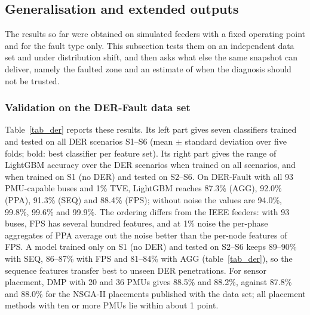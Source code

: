 \documentclass[11pt]{article}
\newenvironment{nw}{}{}
\begin{document}
\begin{nw}
\subsection{Generalisation and extended outputs}\label{subsec5_gen}
The results so far were obtained on simulated feeders with a fixed operating point and for the fault type only. This subsection tests them on an independent data set and under distribution shift, and then asks what else the same snapshot can deliver, namely the faulted zone and an estimate of when the diagnosis should not be trusted.
\end{nw}

\begin{nw}
\subsubsection{Validation on the DER-Fault data set}\label{subsec5_7b}

Table~\ref{tab_der} reports these results. Its left part gives seven classifiers trained and tested on all DER scenarios S1--S6 (mean $\pm$ standard deviation over five folds; bold: best classifier per feature set). Its right part gives the range of LightGBM accuracy over the DER scenarios when trained on all scenarios, and when trained on S1 (no DER) and tested on S2--S6. On DER-Fault with all 93 PMU-capable buses and 1\% TVE, LightGBM reaches 87.3\% (AGG), 92.0\% (PPA), 91.3\% (SEQ) and 88.4\% (FPS); without noise the values are 94.0\%, 99.8\%, 99.6\% and 99.9\%. The ordering differs from the IEEE feeders: with 93 buses, FPS has several hundred features, and at 1\% noise the per-phase aggregates of PPA average out the noise better than the per-node features of FPS. A model trained only on S1 (no DER) and tested on S2--S6 keeps 89--90\% with SEQ, 86--87\% with FPS and 81--84\% with AGG (table~\ref{tab_der}), so the sequence features transfer best to unseen DER penetrations. For sensor placement, DMP with 20 and 36 PMUs gives 88.5\% and 88.2\%, against 87.8\% and 88.0\% for the NSGA-II placements published with the data set; all placement methods with ten or more PMUs lie within about 1 point.

\end{nw}
\end{document}
